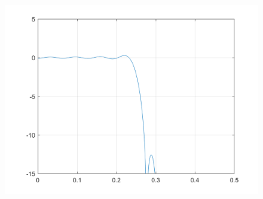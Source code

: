 \documentclass[a4paper, 12pt]{report}
\begin{document}
\begin{figure}[H]
	\centering
	\includegraphics[width=14cm]{G_srrc}
	\caption{}\label{}
\end{figure}

%	
%		
%	
%		
%		
%	
\end{document}

